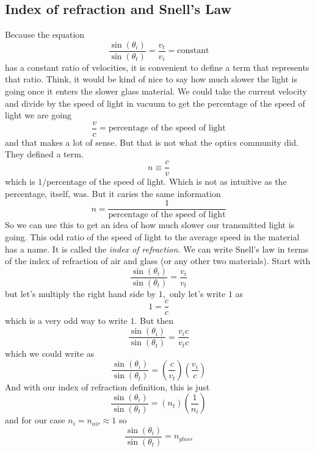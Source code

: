 \documentclass{article}
\begin{document}
\subsection{Index of refraction and Snell's Law}

Because the equation%
\begin{equation}
\frac{\sin \left( \theta _{i}\right) }{\sin \left( \theta _{t}\right) }=%
\frac{v_{t}}{v_{i}}=\text{constant}
\end{equation}%
has a constant ratio of velocities, it is convenient to define a term that
represents that ratio. Think, it would be kind of nice to say how much
slower the light is going once it enters the slower glass material. We could
take the current velocity and divide by the speed of light in vacuum to get
the percentage of the speed of light we are going%
\[
\frac{v}{c}=\text{percentage of the speed of light}
\]%
and that makes a lot of sense. But that is not what the optics community
did. They defined a term. 
\begin{equation}
n\equiv \frac{c}{v}
\end{equation}%
which is $1/$percentage of the speed of light. Which is not as intuitive as
the percentage, itself, was. But it caries the same information 
\[
n=\frac{1}{\text{percentage of the speed of light}}
\]%
So we can use this to get an idea of how much slower our transmitted light
is going. This odd ratio of the speed of light to the average speed in the
material has a name. It is called the \emph{index of refraction.} We can
write Snell's law in terms of the index of refraction of air and glass (or
any other two materials). Start with%
\begin{equation}
\frac{\sin \left( \theta _{i}\right) }{\sin \left( \theta _{t}\right) }=%
\frac{v_{i}}{v_{t}}
\end{equation}%
but let's multiply the right hand side by $1,$ only let's write $1$ as 
\[
1=\frac{c}{c}
\]%
which is a very odd way to write $1.$ But then%
\begin{equation}
\frac{\sin \left( \theta _{i}\right) }{\sin \left( \theta _{t}\right) }=%
\frac{v_{i}c}{v_{t}c}
\end{equation}%
which we could write as%
\begin{equation}
\frac{\sin \left( \theta _{i}\right) }{\sin \left( \theta _{t}\right) }%
=\left( \frac{c}{v_{t}}\right) \left( \frac{v_{i}}{c}\right)
\end{equation}%
And with our index of refraction definition, this is just%
\begin{equation}
\frac{\sin \left( \theta _{i}\right) }{\sin \left( \theta _{t}\right) }%
=\left( n_{t}\right) \left( \frac{1}{n_{i}}\right)
\end{equation}%
and for our case $n_{i}=n_{air}\approx 1$ so 
\begin{equation}
\frac{\sin \left( \theta _{i}\right) }{\sin \left( \theta _{t}\right) }%
=n_{glass}
\end{equation}
\end{document}
